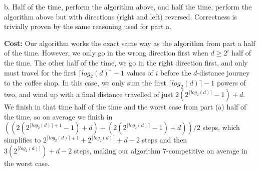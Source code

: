 \documentclass[12pt]{article}
\begin{document}
b. Half of the time, perform the algorithm above, and half the time, perform the algorithm above but with directions (right and left) reversed. Correctness is trivially proven by the same reasoning used for part a.

\noindent \textbf{Cost:} Our algorithm works the exact same way as the algorithm from part a half of the time. However, we only go in the wrong direction first when $d \geq 2^i$ half of the time. The other half of the time, we go in the right direction first, and only must travel for the first $\lceil log_2(d) \rceil-1$ values of $i$ before the $d$-distance journey to the coffee shop. In this case, we only sum the first $\lceil log_2(d) \rceil-1$ powers of two, and wind up with a final distance travelled of just $2(2^{\lceil log_2(d) \rceil}-1)+d$. We finish in that time half of the time and the worst case from part (a) half of the time, so on average we finish in $((2(2^{\lceil log_2(d) \rceil+1}-1)+d)+(2(2^{\lceil log_2(d) \rceil}-1)+d))/2$ steps, which simplifies to $2^{\lceil log_2(d) \rceil+1}+2^{\lceil log_2(d) \rceil}+d-2$ steps and then $3(2^{\lceil log_2(d) \rceil})+d-2$ steps, making our algorithm 7-competitive on average in the worst case.
\end{document}
